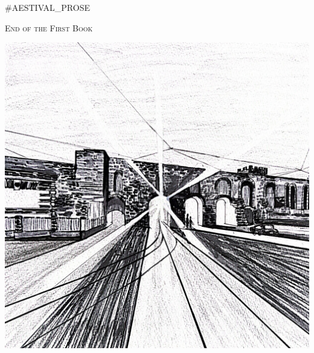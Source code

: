 \documentclass{amsbook}
\begin{document}
    #AESTIVAL_PROSE

    \bigskip
    \bigskip
    \begin{center}
        \textsc{End of the First Book}
    \end{center}
    \clearpage

    \thispagestyle{empty}
    \vspace*{\fill}
    {\centering
    \includegraphics[width=\textwidth]{content/images/porta_maggiore.jpg}}
    \vspace*{\fill}
    \clearpage
\end{document}
